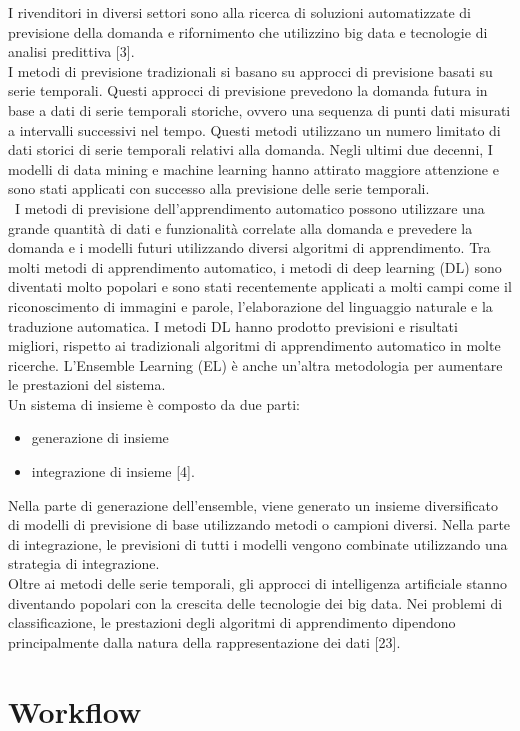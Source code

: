 \documentclass[12pt,a4paper]{report}
\begin{document}
I rivenditori in diversi settori sono alla ricerca di soluzioni automatizzate di previsione della domanda e rifornimento che utilizzino big data e tecnologie di analisi predittiva [3]. \\
I metodi di previsione tradizionali si basano su approcci di previsione basati su serie temporali. Questi approcci di previsione prevedono la domanda futura in base a dati di serie temporali storiche, ovvero una sequenza di punti dati misurati a intervalli successivi nel tempo. Questi metodi utilizzano un numero limitato di dati storici di serie temporali relativi alla domanda. Negli ultimi due decenni, I modelli di data mining e machine learning hanno attirato maggiore attenzione e sono stati applicati con successo alla previsione delle serie temporali.\\\
I metodi di previsione dell'apprendimento automatico possono utilizzare una grande quantità di dati e funzionalità correlate alla domanda e prevedere la domanda e i modelli futuri utilizzando diversi algoritmi di apprendimento. Tra molti metodi di apprendimento automatico, i metodi di deep learning (DL) sono diventati molto popolari e sono stati recentemente applicati a molti campi come il riconoscimento di immagini e parole, l'elaborazione del linguaggio naturale e la traduzione automatica. I metodi DL hanno prodotto previsioni e risultati migliori, rispetto ai tradizionali algoritmi di apprendimento automatico in molte ricerche. L'Ensemble Learning (EL) è anche un'altra metodologia per aumentare le prestazioni del sistema.\\
Un sistema di insieme è composto da due parti:
\begin{itemize}
\item generazione di insieme
\item integrazione di insieme [4].
\end{itemize}
Nella parte di generazione dell'ensemble, viene generato un insieme diversificato di modelli di previsione di base utilizzando metodi o campioni diversi. Nella parte di integrazione, le previsioni di tutti i modelli vengono combinate utilizzando una strategia di integrazione.\\
Oltre ai metodi delle serie temporali, gli approcci di intelligenza artificiale stanno diventando popolari con la crescita delle tecnologie dei big data.
Nei problemi di classificazione, le prestazioni degli algoritmi di apprendimento dipendono principalmente dalla natura della rappresentazione dei dati [23].

\section{Workflow}
\end{document}
